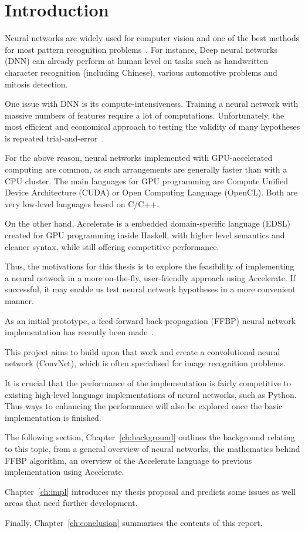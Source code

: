 \chapter{Introduction}\label{ch:intro}

Neural networks are widely used for computer vision and one of the best methods for most pattern recognition problems~\cite{Nvi14}. For instance, Deep neural networks (DNN) can already perform at human level on tasks such as handwritten character recognition (including Chinese), various automotive problems and mitosis detection.

One issue with DNN is its compute-intensiveness. Training a neural network with massive numbers of features require a lot of computations. Unfortunately, the most efficient and economical approach to testing the validity of many hypotheses is repeated trial-and-error~\cite{Ng12}.

For the above reason, neural networks implemented with GPU-accelerated computing are common, as such arrangements are generally faster than with a CPU cluster. The main languages for GPU programming are Compute Unified Device Architecture (CUDA) or Open Computing Language (OpenCL). Both are very low-level languages based on C/C++. 

On the other hand, Accelerate is a embedded domain-specific language (EDSL) created for GPU programming inside Haskell, with higher level semantics and cleaner syntax, while still offering competitive performance. 

Thus, the motivations for this thesis is to explore the feasibility of implementing a neural network in a more on-the-fly, user-friendly approach using Accelerate. If successful, it may enable us test neural network hypotheses in a more convenient manner. 

As an initial prototype, a feed-forward back-propagation (FFBP) neural network implementation has recently been made~\cite{Eve16}. 


This project aims to build upon that work and create a convolutional neural network (ConvNet), which is often specialised for image recognition problems.

It is crucial that the performance of the implementation is fairly competitive to existing high-level language implementations of neural networks, such as Python. Thus ways to enhancing the performance will also be explored once the basic implementation is finished.


The following section, Chapter~\ref{ch:background} outlines the background relating to this topic, from a general overview of neural networks, the mathematics behind FFBP algorithm, an overview of the Accelerate language to previous implementation using Accelerate.

Chapter~\ref{ch:impl} introduces my thesis proposal and predicts some issues as well areas that need further development.

Finally, Chapter~\ref{ch:conclusion} summarises the contents of this report.
